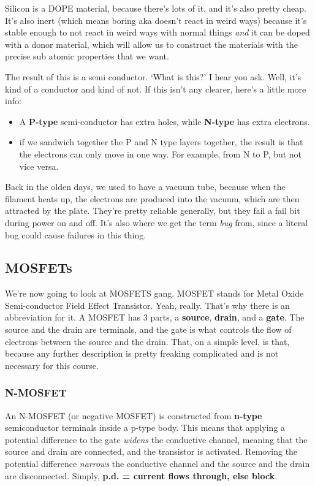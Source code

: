 \documentclass[11pt,a4paper,titlepage,dvipsnames,cmyk]{scrartcl}
\begin{document}
Silicon is a DOPE material, because there's lots of it, and it's also pretty
cheap. It's also inert (which means boring aka doesn't react in weird ways)
because it's stable enough to not react in weird ways with normal things
\textit{and} it can be doped with a donor material, which will allow us to
construct the materials with the precise sub atomic properties that we want.

The result of this is a semi conductor. `What is this?' I hear you ask. Well,
it's kind of a conductor and kind of not. If this isn't any clearer, here's a
little more info:
\begin{itemize}
    \item A \textbf{P-type} semi-conductor has extra holes, while
        \textbf{N-type} has extra electrons.
    \item if we sandwich together the P and N type layers together, the result
        is that the electrons can only move in one way. For example, from N to
        P, but not vice versa.
\end{itemize}

Back in the olden days, we used to have a vacuum tube, because when the filament
heats up, the electrons are produced into the vacuum, which are then attracted
by the plate. They're pretty reliable generally, but they fail a fail bit during
power on and off. It's also where we get the term \textit{bug} from, since a
literal bug could cause failures in this thing.

\subsection{MOSFETs}%
\label{sub:MOSFETs}
We're now going to look at MOSFETS gang. MOSFET stands for Metal Oxide
Semi-conductor Field Effect Transistor. Yeah, really. That's why there is an
abbreviation for it. A MOSFET has 3 parts, a \textbf{source}, \textbf{drain},
and a \textbf{gate}. The source and the drain are terminals, and the gate is
what controls the flow of electrons between the source and the drain. That, on a
simple level, is that, because any further description is pretty freaking
complicated and is not necessary for this course.

\subsubsection{N-MOSFET}%
\label{ssub:N-MOSFET}
An N-MOSFET (or negative MOSFET) is constructed from \textbf{n-type}
semiconductor terminals inside a p-type body. This means that applying a
potential difference to
the gate \textit{widens} the conductive channel, meaning that the source and
drain are connected, and the transistor is activated. Removing the potential
difference
\textit{narrows} the conductive channel and the source and the drain are
disconnected. Simply, \textbf{p.d. = current flows through, else block}.
\end{document}
